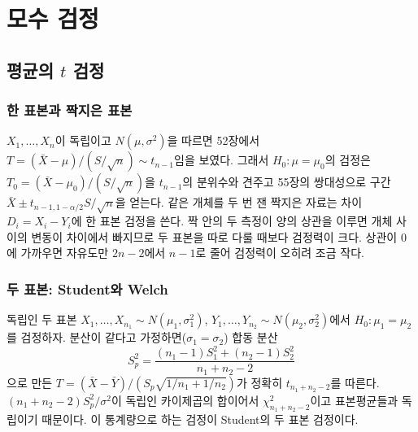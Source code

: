 \chapter{모수 검정}
\label{ch:parametric-tests}


\section{평균의 $t$ 검정}
\label{sec:t-tests}

\subsection{한 표본과 짝지은 표본}

$X_1,\dots,X_n$이 독립이고 $N(\mu,\sigma^2)$을 따르면 52장에서 $T=(\bar X-\mu)/(S/\sqrt n)\sim t_{n-1}$임을 보였다. 그래서 $H_0:\mu=\mu_0$의 검정은 $T_0=(\bar X-\mu_0)/(S/\sqrt n)$을 $t_{n-1}$의 분위수와 견주고 55장의 쌍대성으로 구간 $\bar X\pm t_{n-1,1-\alpha/2}S/\sqrt n$을 얻는다. 같은 개체를 두 번 잰 짝지은 자료는 차이 $D_i=X_i-Y_i$에 한 표본 검정을 쓴다. 짝 안의 두 측정이 양의 상관을 이루면 개체 사이의 변동이 차이에서 빠지므로 두 표본을 따로 다룰 때보다 검정력이 크다. 상관이 $0$에 가까우면 자유도만 $2n-2$에서 $n-1$로 줄어 검정력이 오히려 조금 작다.

\subsection{두 표본: Student와 Welch}

독립인 두 표본 $X_1,\dots,X_{n_1}\sim N(\mu_1,\sigma_1^2)$, $Y_1,\dots,Y_{n_2}\sim N(\mu_2,\sigma_2^2)$에서 $H_0:\mu_1=\mu_2$를 검정하자. 분산이 같다고 가정하면($\sigma_1=\sigma_2$) 합동 분산
\[
S_p^2=\frac{(n_1-1)S_1^2+(n_2-1)S_2^2}{n_1+n_2-2}
\]
으로 만든 $T=(\bar X-\bar Y)/(S_p\sqrt{1/n_1+1/n_2})$가 정확히 $t_{n_1+n_2-2}$를 따른다. $(n_1+n_2-2)S_p^2/\sigma^2$이 독립인 카이제곱의 합이어서 $\chi^2_{n_1+n_2-2}$이고 표본평균들과 독립이기 때문이다. 이 통계량으로 하는 검정이 Student의 두 표본 검정이다.

